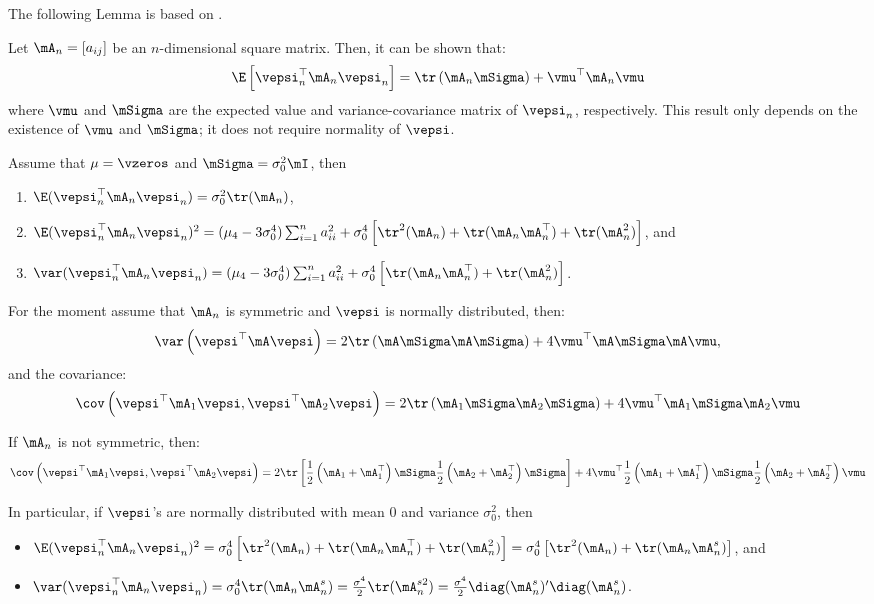 \documentclass[english,12pt]{book}\usepackage[]{graphicx}\usepackage[]{xcolor}
\begin{document}
The following Lemma is based on \citep{lee2004asymptotic}.

\begin{lemma}\label{lemma:second-mom-lee}
Let $\mA_n=\left[a_{ij}\right]$ be an $n$-dimensional square matrix. Then, it can be shown that:
\begin{equation*}
\E\left[\vepsi^\top_n\mA_n\vepsi_n\right]=\tr\left(\mA_n\mSigma\right)+\vmu^\top\mA_n\vmu
\end{equation*}
%
where $\vmu$ and $\mSigma$ are the expected value and variance-covariance matrix of $\vepsi_n$, respectively. This result only depends on the existence of $\vmu$ and $\mSigma$; it does not require normality of $\vepsi$. 

Assume that $\mu = \vzeros$ and $\mSigma = \sigma_0^2\mI$, then
\begin{enumerate}
  \item $\E(\vepsi_n^\top\mA_n\vepsi_n) = \sigma^2_0\tr(\mA_n)$,
  \item $\E(\vepsi_n^\top\mA_n\vepsi_n)^2 = (\mu_4 - 3\sigma^4_0)\sum_{i = 1}^na_{ii}^2+\sigma^4_0\left[\tr^2(\mA_n) + \tr(\mA_n\mA_n^\top)+\tr(\mA^2_n)\right]$, and
  \item $\var(\vepsi_n^\top\mA_n\vepsi_n) = (\mu_4 - 3\sigma^4_0)\sum_{i = 1}^na_{ii}^2+\sigma^4_0\left[\tr(\mA_n\mA_n^\top)+\tr(\mA^2_n)\right]$.
\end{enumerate}

For the moment assume that $\mA_n$ is symmetric and $\vepsi$ is normally distributed, then:
\begin{equation*}
\var\left(\vepsi^\top\mA\vepsi\right)= 2\tr\left(\mA\mSigma\mA\mSigma\right) + 4\vmu^\top\mA\mSigma\mA\vmu,
\end{equation*}
%
and the covariance:
\begin{equation*}
\cov\left(\vepsi^\top\mA_1\vepsi, \vepsi^\top\mA_2\vepsi\right)= 2\tr\left(\mA_1\mSigma\mA_2\mSigma\right) + 4\vmu^\top\mA_1\mSigma\mA_2\vmu
\end{equation*}

If $\mA_n$ is not symmetric, then:
\begin{equation}\label{eq:var-quadratic-form}
\cov\left(\vepsi^\top\mA_1\vepsi, \vepsi^\top\mA_2\vepsi\right)= 2\tr\left[\frac{1}{2}\left(\mA_1 + \mA_1^\top\right)\mSigma\frac{1}{2}\left(\mA_2 + \mA_2^\top\right)\mSigma\right] + 4\vmu^\top\frac{1}{2}\left(\mA_1 + \mA_1^\top\right)\mSigma\frac{1}{2}\left(\mA_2 + \mA_2^\top\right)\vmu
\end{equation}

In particular, if $\vepsi$'s are normally distributed with mean 0 and variance $\sigma_0^2$, then 
\begin{itemize}
  \item $\E(\vepsi_n^\top\mA_n\vepsi_n)^2 = \sigma^4_0\left[\tr^2(\mA_n) + \tr(\mA_n\mA_n^\top)+\tr(\mA^2_n)\right] = \sigma^4_0\left[\tr^2(\mA_n) + \tr(\mA_n\mA_n^{s})\right]$, and
  \item $\var(\vepsi_n^\top\mA_n\vepsi_n) = \sigma^4_0\tr(\mA_n\mA_n^{s}) = \frac{\sigma^4}{2}\tr(\mA_n^{s2}) = \frac{\sigma^4}{2}\diag(\mA_n^s)'\diag(\mA_n^s)$.
\end{itemize}
\end{lemma}
\end{document}
